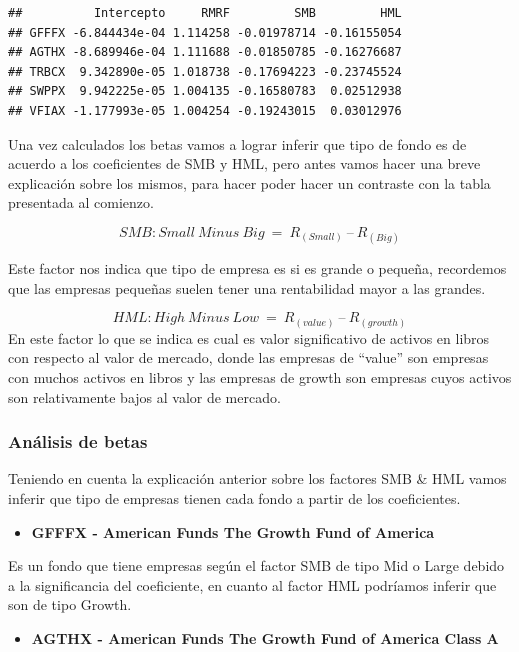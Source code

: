 \documentclass[
  12pt,
]{article}
\providecommand{\tightlist}{%
  \setlength{\itemsep}{0pt}\setlength{\parskip}{0pt}}
\begin{document}
\begin{verbatim}
##          Intercepto     RMRF         SMB         HML
## GFFFX -6.844434e-04 1.114258 -0.01978714 -0.16155054
## AGTHX -8.689946e-04 1.111688 -0.01850785 -0.16276687
## TRBCX  9.342890e-05 1.018738 -0.17694223 -0.23745524
## SWPPX  9.942225e-05 1.004135 -0.16580783  0.02512938
## VFIAX -1.177993e-05 1.004254 -0.19243015  0.03012976
\end{verbatim}

Una vez calculados los betas vamos a lograr inferir que tipo de fondo es
de acuerdo a los coeficientes de SMB y HML, pero antes vamos hacer una
breve explicación sobre los mismos, para hacer poder hacer un contraste
con la tabla presentada al comienzo.

\[
SMB:Small\ Minus\ Big\ =\ R_{\left(Small\right)}\ –\ R_{\left(Big\right)}
\]

Este factor nos indica que tipo de empresa es si es grande o pequeña,
recordemos que las empresas pequeñas suelen tener una rentabilidad mayor
a las grandes.

\[
HML:High\ Minus\ Low\ =\ R_{\left(value\right)}\ –\ R_{\left(growth\right)}
\] En este factor lo que se indica es cual es valor significativo de
activos en libros con respecto al valor de mercado, donde las empresas
de ``value'' son empresas con muchos activos en libros y las empresas de
growth son empresas cuyos activos son relativamente bajos al valor de
mercado.

\hypertarget{anuxe1lisis-de-betas}{%
\subsubsection{Análisis de betas}\label{anuxe1lisis-de-betas}}

Teniendo en cuenta la explicación anterior sobre los factores SMB \& HML
vamos inferir que tipo de empresas tienen cada fondo a partir de los
coeficientes.

\begin{itemize}
\tightlist
\item
  \textbf{GFFFX - American Funds The Growth Fund of America}
\end{itemize}

Es un fondo que tiene empresas según el factor SMB de tipo Mid o Large
debido a la significancia del coeficiente, en cuanto al factor HML
podríamos inferir que son de tipo Growth.

\begin{itemize}
\tightlist
\item
  \textbf{AGTHX - American Funds The Growth Fund of America Class A}
\end{itemize}
\end{document}
